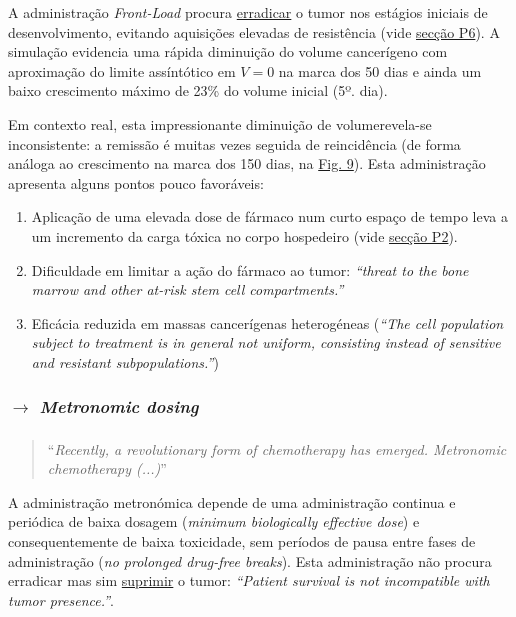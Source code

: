 \vphantom{esperiencia123}

\vphantom{esperiencia123}

A administração \textit{Front-Load} procura \underline{erradicar} o tumor nos estágios iniciais de desenvolvimento, evitando aquisições elevadas de resistência (vide \hyperref[subsec:P6]{secção P6}). A simulação evidencia uma rápida diminuição do volume cancerígeno com aproximação do limite assíntótico em $V = 0$ na marca dos 50 dias e ainda um baixo crescimento máximo de 23\% do volume inicial (5º. dia). 

Em contexto real, esta impressionante diminuição de volume\footnotemark[7] revela-se inconsistente: a remissão é muitas vezes seguida de reincidência (de forma análoga ao crescimento na marca dos 150 dias, na \hyperref[fig:P5-fib]{Fig. 9})\footnotemark[8]. Esta administração apresenta alguns pontos pouco favoráveis:
\vspace{-0.75em}
\begin{enumerate}
    \itemsep 0em 
    \item Aplicação de uma elevada dose de fármaco num curto espaço de tempo leva a um incremento da carga tóxica no corpo hospedeiro (vide \hyperref[subsec:P2]{secção P2}).
    \vspace{-0.5em}\item Dificuldade em limitar a ação do fármaco ao tumor: \textit{``threat to the bone marrow and other at-risk stem cell compartments.''}\cite{Hahnfeldt2003-oy}
    \vspace{-0.5em}\item Eficácia reduzida em massas cancerígenas heterogéneas (\textit{``The cell population subject to treatment is in general not uniform, consisting instead of sensitive and resistant subpopulations.''})
\end{enumerate}

\vspace{-2em}
\subsubsection{$\pmb{\xrightarrow[]{}}$ \textit{Metronomic dosing}}
\label{subsubsec:metronomic-dosing}
\begin{quote}
    ``\textit{Recently, a revolutionary form of chemotherapy has emerged. Metronomic chemotherapy (...)}''\cite{elisa_2017}
\end{quote}
A administração metronómica depende de uma administração continua e periódica de baixa dosagem (\textit{minimum biologically effective dose}\cite{elisa_2017}) e consequentemente de baixa toxicidade, sem períodos de pausa entre fases de administração (\textit{no prolonged drug-free breaks}\cite{elisa_2017}). Esta administração não procura erradicar mas sim \underline{suprimir} o tumor: \textit{``Patient survival is not incompatible with tumor presence.''}\cite{Hahnfeldt2003-oy}.

